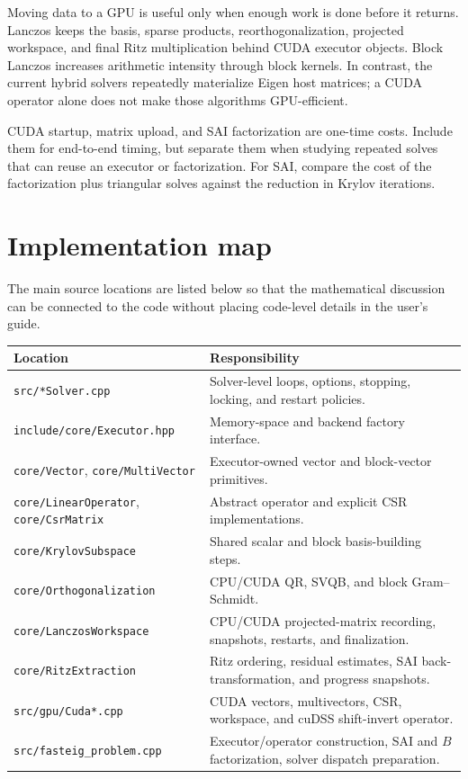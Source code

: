 \documentclass[11pt]{article}
\newcommand{\code}[1]{\texttt{#1}}
\begin{document}
Moving data to a GPU is useful only when enough work is done before it returns.
Lanczos keeps the basis, sparse products, reorthogonalization, projected
workspace, and final Ritz multiplication behind CUDA executor objects.  Block
Lanczos increases arithmetic intensity through block kernels.  In contrast,
the current hybrid solvers repeatedly materialize Eigen host matrices; a CUDA
operator alone does not make those algorithms GPU-efficient.

CUDA startup, matrix upload, and SAI factorization are one-time costs.  Include
them for end-to-end timing, but separate them when studying repeated solves
that can reuse an executor or factorization.  For SAI, compare the cost of the
factorization plus triangular solves against the reduction in Krylov iterations.

\section{Implementation map}

The main source locations are listed below so that the mathematical discussion
can be connected to the code without placing code-level details in the user's
guide.

\begin{center}
\small
\begin{tabular}{P{0.37\textwidth} P{0.53\textwidth}}
\toprule
Location & Responsibility \\
\midrule
\code{src/*Solver.cpp} & Solver-level loops, options, stopping, locking, and restart policies. \\
\code{include/core/Executor.hpp} & Memory-space and backend factory interface. \\
\code{core/Vector}, \code{core/MultiVector} & Executor-owned vector and block-vector primitives. \\
\code{core/LinearOperator}, \code{core/CsrMatrix} & Abstract operator and explicit CSR implementations. \\
\code{core/KrylovSubspace} & Shared scalar and block basis-building steps. \\
\code{core/Orthogonalization} & CPU/CUDA QR, SVQB, and block Gram--Schmidt. \\
\code{core/LanczosWorkspace} & CPU/CUDA projected-matrix recording, snapshots, restarts, and finalization. \\
\code{core/RitzExtraction} & Ritz ordering, residual estimates, SAI back-transformation, and progress snapshots. \\
\code{src/gpu/Cuda*.cpp} & CUDA vectors, multivectors, CSR, workspace, and cuDSS shift-invert operator. \\
\code{src/fasteig\_problem.cpp} & Executor/operator construction, SAI and $B$ factorization, solver dispatch preparation. \\
\bottomrule
\end{tabular}
\end{center}
\end{document}
